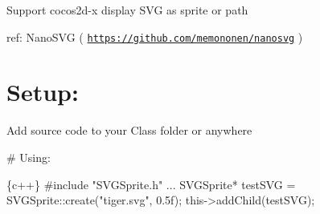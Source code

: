 

Support cocos2d-\/x display S\+VG as sprite or path

ref\+: Nano\+S\+VG ( \href{https://github.com/memononen/nanosvg}{\tt https\+://github.\+com/memononen/nanosvg} )

\section*{Setup\+:}

Add source code to your Class folder or anywhere

\# Using\+: 
\begin{DoxyCode}
\{c++\}
#include "SVGSprite.h"
...
SVGSprite* testSVG = SVGSprite::create("tiger.svg", 0.5f);
this->addChild(testSVG);
\end{DoxyCode}
 